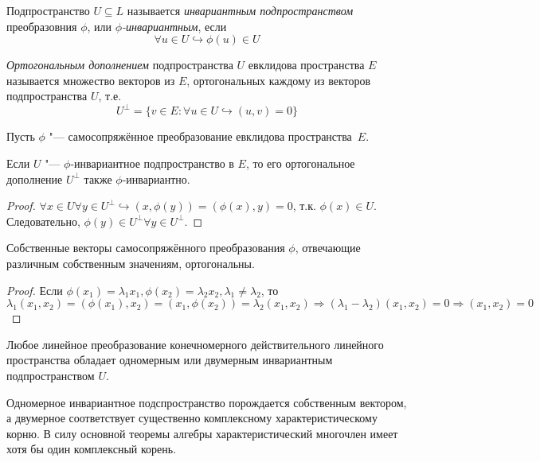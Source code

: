   \begin{defn}
  Подпространство $U \subseteq L$ называется \textit{инвариантным подпространством} преобразовния $\phi$, или \textit{$\phi$-инвариантным}, если
  \begin{equation}\label{23.1.invariant}
  \forall u \in U \hookrightarrow \phi(u) \in U
  \end{equation}
  \end{defn} 
  
  \begin{defn}
  \textit{Ортогональным дополнением} подпространства $U$ евклидова пространства $E$ называется множество векторов из $E$, ортогональных каждому из векторов подпространства $U$, т.е.
  \begin{equation}\label{23.1.orthogonal}
  U^\perp=\{v \in E: \forall u \in U \hookrightarrow (u,v)=0\}
  \end{equation}
  \end{defn}
  
  Пусть $\phi$ "--- самосопряжённое преобразование евклидова пространства~$E$.
  \begin{stt}\label{23.1.stt_orth}
  Если $U$ "--- $\phi$-инвариантное подпространство в $E$, то его ортогональное дополнение $U^\perp$ также $\phi$-инвариантно.
  \end{stt}
  \begin{proof}
  $\forall x \in U \forall y \in U^\perp \hookrightarrow (x,\phi(y))=(\phi(x),y)=0$, т.к. $\phi(x)\in U$. Следовательно, $\phi(y)\in U^\perp \forall y\in U^\perp$.
  \end{proof}
  
  \begin{stt}
  Собственные векторы самосопряжённого преобразования $\phi$, отвечающие различным собственным значениям, ортогональны.
  \end{stt}
  \begin{proof}
  Если $\phi(x_1)=\lambda_1 x_1, \phi(x_2)=\lambda_2 x_2, \lambda_1 \neq \lambda_2$, то $\lambda_1(x_1,x_2)=(\phi(x_1),x_2)=(x_1,\phi(x_2))=\lambda_2(x_1,x_2) \Rightarrow (\lambda_1-\lambda_2)(x_1,x_2)=0 \Rightarrow (x_1,x_2)=0$
  \end{proof}    
    
  \begin{lemm}\label{23.1.lemm}
  Любое линейное преобразование конечномерного действительного линейного пространства обладает одномерным или двумерным инвариантным подпространством $U$.
  \end{lemm}
  \begin{notion}
  Одномерное инвариантное подспространство порождается собственным вектором, а двумерное соответствует существенно комплексному характеристическому корню. В силу основной теоремы алгебры характеристический многочлен имеет хотя бы один комплексный корень.
  \end{notion}
  

